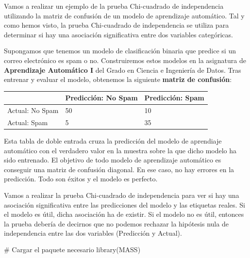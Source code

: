\documentclass[
  letterpaper,
  DIV=11,
  numbers=noendperiod]{scrreprt}
\newenvironment{Shaded}{\begin{snugshade}}{\end{snugshade}}
\newcommand{\CommentTok}[1]{\textcolor[rgb]{0.37,0.37,0.37}{#1}}
\newcommand{\FunctionTok}[1]{\textcolor[rgb]{0.28,0.35,0.67}{#1}}
\newcommand{\NormalTok}[1]{\textcolor[rgb]{0.00,0.23,0.31}{#1}}
\begin{document}
\begin{tcolorbox}[enhanced jigsaw, arc=.35mm, breakable, coltitle=black, left=2mm, opacityback=0, bottomtitle=1mm, colbacktitle=quarto-callout-tip-color!10!white, title=\textcolor{quarto-callout-tip-color}{\faLightbulb}\hspace{0.5em}{Ejemplo Práctico. Prueba Chi-cuadrado en Aprendizaje Automático}, titlerule=0mm, colback=white, colframe=quarto-callout-tip-color-frame, bottomrule=.15mm, rightrule=.15mm, opacitybacktitle=0.6, toptitle=1mm, toprule=.15mm, leftrule=.75mm]

Vamos a realizar un ejemplo de la prueba Chi-cuadrado de independencia
utilizando la matriz de confusión de un modelo de aprendizaje
automático. Tal y como hemos visto, la prueba Chi-cuadrado de
independencia se utiliza para determinar si hay una asociación
significativa entre dos variables categóricas.

Supongamos que tenemos un modelo de clasificación binaria que predice si
un correo electrónico es spam o no. Construiremos estos modelos en la
asignatura de \textbf{Aprendizaje Automático I} del Grado en Ciencia e
Ingeniería de Datos. Tras entrenar y evaluar el modelo, obtenemos la
siguiente \textbf{matriz de confusión}:

\begin{longtable}[]{@{}lll@{}}
\toprule\noalign{}
& Predicción: No Spam & Predicción: Spam \\
\midrule\noalign{}
\endhead
\bottomrule\noalign{}
\endlastfoot
Actual: No Spam & 50 & 10 \\
Actual: Spam & 5 & 35 \\
\end{longtable}

Esta tabla de doble entrada cruza la predicción del modelo de aprendiaje
automático con el verdadero valor en la muestra sobre la que dicho
modelo ha sido entrenado. El objetivo de todo modelo de aprendizaje
automático es conseguir una matriz de confusión diagonal. En ese caso,
no hay errores en la predicción. Todo son éxitos y el modelo es
perfecto.

Vamos a realizar la prueba Chi-cuadrado de independencia para ver si hay
una asociación significativa entre las predicciones del modelo y las
etiquetas reales. Si el modelo es útil, dicha asociación ha de existir.
Si el modelo no es útil, entonces la prueba debería de decirnos que no
podemos rechazar la hipótesis nula de independencia entre las dos
variables (Predicción y Actual).

\begin{Shaded}
\begin{Highlighting}[]
\CommentTok{\# Cargar el paquete necesario}
\FunctionTok{library}\NormalTok{(MASS)}


\end{Highlighting}
\end{Shaded}
\end{tcolorbox}
\end{document}
